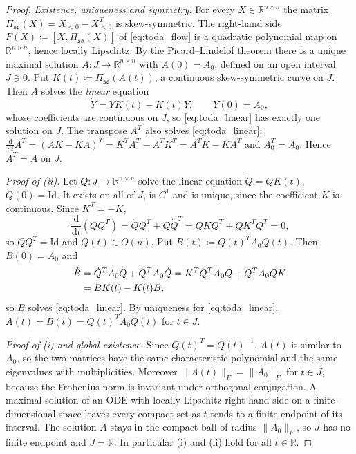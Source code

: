 \documentclass[11pt,a4paper,reqno]{amsart}
\theoremstyle{definition}
\numberwithin{equation}{section}
\providecommand{\R}{\mathbb{R}}
\newcommand{\Id}{\mathrm{Id}}
\newcommand{\dif}{\,\mathrm{d}}
\providecommand{\R}{\mathbb{R}}
\begin{document}
\begin{proof}
\emph{Existence, uniqueness and symmetry.} For every $X \in \R^{n \times n}$ the matrix $\Pi_{\mathfrak{so}}(X) = X_{<0} - X_{<0}^T$ is skew-symmetric. The right-hand side $F(X) \coloneqq [X, \Pi_{\mathfrak{so}}(X)]$ of \eqref{eq:toda_flow} is a quadratic polynomial map on $\R^{n \times n}$, hence locally Lipschitz. By the Picard--Lindel\"of theorem there is a unique maximal solution $A \colon J \to \R^{n \times n}$ with $A(0) = A_0$, defined on an open interval $J \ni 0$. Put $K(t) \coloneqq \Pi_{\mathfrak{so}}(A(t))$, a continuous skew-symmetric curve on $J$. Then $A$ solves the \emph{linear} equation
\begin{equation}
    \label{eq:toda_linear}
    \dot Y = Y K(t) - K(t) Y, \qquad Y(0) = A_0,
\end{equation}
whose coefficients are continuous on $J$, so \eqref{eq:toda_linear} has exactly one solution on $J$. The transpose $A^T$ also solves \eqref{eq:toda_linear}: $\frac{\dif}{\dif t}A^T = (AK - KA)^T = K^T A^T - A^T K^T = A^T K - K A^T$ and $A_0^T = A_0$. Hence $A^T = A$ on $J$.

\emph{Proof of (ii).} Let $Q \colon J \to \R^{n \times n}$ solve the linear equation $\dot Q = Q K(t)$, $Q(0) = \Id$. It exists on all of $J$, is $C^1$ and is unique, since the coefficient $K$ is continuous. Since $K^T = -K$,
\begin{equation}
    \frac{\dif}{\dif t}(Q Q^T) = \dot{Q} Q^T + Q \dot{Q}^T = Q K Q^T + Q K^T Q^T = 0,
\end{equation}
so $Q Q^T = \Id$ and $Q(t) \in O(n)$. Put $B(t) \coloneqq Q(t)^T A_0 Q(t)$. Then $B(0) = A_0$ and
\begin{align}
    \dot B &= \dot{Q}^T A_0 Q + Q^T A_0 \dot{Q} = K^T Q^T A_0 Q + Q^T A_0 Q K \notag \\
    &= B K(t) - K(t) B,
\end{align}
so $B$ solves \eqref{eq:toda_linear}. By uniqueness for \eqref{eq:toda_linear}, $A(t) = B(t) = Q(t)^T A_0 Q(t)$ for $t \in J$.

\emph{Proof of (i) and global existence.} Since $Q(t)^T = Q(t)^{-1}$, $A(t)$ is similar to $A_0$, so the two matrices have the same characteristic polynomial and the same eigenvalues with multiplicities. Moreover $\|A(t)\|_F = \|A_0\|_F$ for $t \in J$, because the Frobenius norm is invariant under orthogonal conjugation. A maximal solution of an ODE with locally Lipschitz right-hand side on a finite-dimensional space leaves every compact set as $t$ tends to a finite endpoint of its interval. The solution $A$ stays in the compact ball of radius $\|A_0\|_F$, so $J$ has no finite endpoint and $J = \R$. In particular (i) and (ii) hold for all $t \in \R$.


\end{proof}
\end{document}
